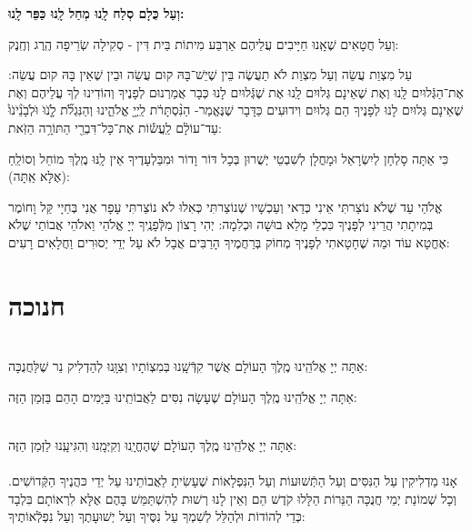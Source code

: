 \documentclass[twoside, openany, parskip=half, 11pt]{book}
\begin{document}
\textbf{וְעַל כֻּלָם סְלַח לָֽנוּ מְחַל לָֽנוּ כַּפֵּר לָֽנוּ:}

וְעַל חֲטָאִים שֶׁאָֽנוּ חַיָּיבִים עֲלֵיהֶם אַרְבַּע מִיתוֹת בֵּית דִּין - סְקִילָה שְׂרֵיפָה הֶֽרֶג וְחֶֽנֶק:

עַל מִצְוַת עֲשֵׂה וְעַל מִצְוַת לֹא תַעֲשֶׂה בֵּין שֶׁיֵשׁ־בָּהּ קוּם עֲשֵׂה וּבֵין שֶׁאֵין בָּהּ קוּם עֲשֵׂה: אֶת־הַגְּֿלוּיִם לָֽנוּ וְאֶת שֶׁאֵינָם גְּלוּיִם לָֽנוּ אֶת שֶׁגְּֿלוּיִם לָנוּ כְּבָר אֲמַרְנוּם לְפָנֶיךָ וְהוֹדִינוּ לְךָ עֲלֵיהֶם וְאֶת שֶׁאֵינָם גְּלוּיִם לָנוּ לְפָנֶיךָ הֵם גְּלוּיִם וִידוּעִים כַּדָּבָר שֶׁנֶּאֱמַר- הַנִּ֨סְתָּרֹ֔ת
 לַֽיְיָ֖ אֱלֹהֵ֑ינוּ וְהַנִּגְלֹ֞ת לָֹ֤נֹוֹּ וֹּלְֹבָֹנֵֹ֨יֹנֹוֹּ֙ עַד־עוֹלָ֔ם לַֽעֲשׂ֕וֹת אֶת־כָּל־דִּבְרֵ֖י הַתּוֹרָ֥ה הַזֹּֽאת:

כִּי אַתָּה סָלְחָן לְיִשְׂרָאֵל וּמָחֳלָן לְשִׁבְטֵי יְשֻׁרוּן בְּכָל דּוֹר וָדוֹר 
וּמִבַּלְעָדֶיךָ אֵין לָֽנּוּ מֶֽלֶךְ מוֹחֵל וְסוֹלֵֽחַ (אֶלָּא אַֽתָּה):

 אֱלֹהַי עַד שֶׁלֹא נוֹצַרתִּי אֵינִי כְּדַאי וְעַכְשָׁיו שֶׁנוֹצַרתִּי כְּאִלוּ לֹא נוֹצַרתִּי עָפָר אֲנִי בְּחַיָי קַּל וָחוֹמֶר בְּמִיתָתִי הֲרֵינִי לְפָּנֶיךָ כִּכְלֵי מָלֵא בוּשָׁה וּכְלִמָה: יְהִי רָצוֹן מִלְּֿפָנֶֽיךָ יְיָ אֱלֹהַי וֵאלֹהֵי אֲבוֹתַי שֶׁלֹא אֶחֱטָא עוֹד וּמַה שֶׁחָטָאתִי לְפָנֶיךָ מְחוֹק בְּרַחֲמֶיךָ הָרַבִּים אֲבָל לֹא עַל יְדֵי יְסוּרִים וַחֲלָאִים רָעִים:
 
\vfill
\sepline 

\chapter[חנוכה]{ חנוכה }
\label{chanukah}

\\
 אַתָּה יְיָ אֱלֹהֵֽינוּ מֶֽלֶךְ הָעוֹלָם 
אֲשֶׁר קִדְּֿשָֽׁנוּ בְּמִצְוֹתָיו וְצִוָּֽנוּ לְהַדְלִיק נֵר שֶׁלַּחֲנֻכָּה: 

 אַתָּה יְיָ אֱלֹהֵֽינוּ מֶֽלֶךְ הָעוֹלָם שֶׁעָשָׂה נִסִּים לַאֲבוֹתֵֽינוּ בַּיָּמִים הָהֵם בַּזְּמַן הַזֶּה:

\\
 אַתָּה יְיָ אֱלֹהֵֽינוּ מֶֽלֶךְ הָעוֹלָם שֶׁהֶחֱיָֽנוּ וְקִיְּמָֽנוּ וְהִגִּיעָֽנוּ לַזְּמַן הַזֶּה:\\

\\
אָנוּ מַדְלִיקִין
עַל הַנִּסִּים וְעַל הַתְּֿשׁוּעוֹת 
וְעַל הַנִּפְלָאוֹת 
שֶׁעָשִׂיתָ לַאֲבוֹתֵינוּ
עַל יְדֵי כּהֲנֶיךָ הַקְּֿדוֹשִׁים.
וְכָל שְׁמוֹנַת יְמֵי חֲנֻכָּה
הַנֵּרוֹת הַלָּלוּ קֹדֶשׁ הֵם
וְאֵין לָנוּ רְשׁוּת לְהִשְׁתַּמֵּשׁ בָּהֶם
אֶלָּא לִרְאוֹתָם בִּלְבָד
כְּדֵי לְהוֹדוֹת וּלְהַלֵּל לְשִׁמְךָ 
עַל נִסֶּיךָ וְעַל יְשׁוּעָתֶךָ
וְעַל נִפְלְֿאוֹתֶיךָ:
\end{document}
